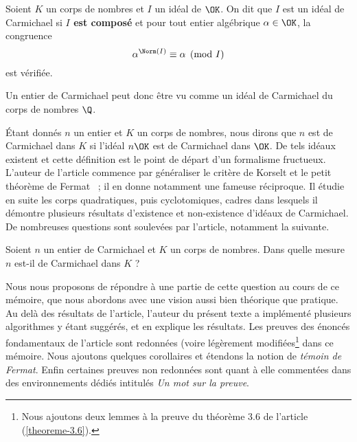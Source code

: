 \begin{definition} Soient $K$ un corps de nombres et $I$ un idéal de $\OK$. On dit que $I$ est un idéal de Carmichael si \textbf{$I$ est composé} et pour tout entier algébrique $\alpha \in \OK$, la congruence
	\begin{equation}\label{congruence-Carmichael}
		\alpha^{\Norm(I)} \equiv \alpha \pmod{I}
	\end{equation}
est vérifiée.
\end{definition}

\begin{remarque}
	Un entier de Carmichael peut donc être vu comme un idéal de Carmichael du corps de nombres $\Q$.
\end{remarque}

Étant donnés $n$ un entier et $K$ un corps de nombres, nous dirons que $n$ est de Carmichael dans $K$ si l'idéal $n\OK$ est de Carmichael dans $\OK$. De tels idéaux existent et cette définition est le point de départ d'un formalisme fructueux. L'auteur de l'article commence par généraliser le critère de Korselt et le petit théorème de Fermat ~; il en donne notamment une fameuse réciproque. Il étudie en suite les corps quadratiques, puis cyclotomiques, cadres dans lesquels il démontre plusieurs résultats d'existence et non-existence d'idéaux de Carmichael. De nombreuses questions sont soulevées par l'article, notamment la suivante. 

\begin{question}\label{question-centrale}Soient $n$ un entier de Carmichael et $K$ un corps de nombres. Dans quelle mesure $n$ est-il de Carmichael dans $K$ ?
\end{question}

Nous nous proposons de répondre à une partie de cette question au cours de ce mémoire, que nous abordons avec une vision aussi bien théorique que pratique. Au delà des résultats de l'article, l'auteur du présent texte a implémenté plusieurs algorithmes y étant suggérés, et en explique les résultats. Les preuves des énoncés fondamentaux de l'article sont redonnées (voire légèrement modifiées\footnote{Nous ajoutons deux lemmes à la preuve du théorème 3.6 de l'article (\ref{theoreme-3.6}).} dans ce mémoire. Nous ajoutons quelques corollaires et étendons la notion de \emph{témoin de Fermat}. Enfin certaines preuves non redonnées sont quant à elle commentées dans des environnements dédiés intitulés \textit{Un mot sur la preuve}.
